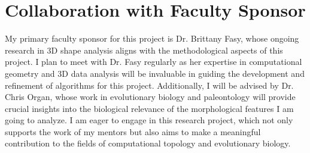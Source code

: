 \documentclass[12pt]{article}
\begin{document}
\section{Collaboration with Faculty Sponsor}
My primary faculty sponsor for this project is Dr. Brittany Fasy, whose ongoing
research in 3D shape analysis aligns with the methodological aspects of this
project. I plan to meet with Dr. Fasy regularly as her expertise in computational 
geometry and 3D data analysis will be invaluable in guiding the development and 
refinement of algorithms for this project. Additionally, I will be advised by
Dr. Chris Organ, whose work in evolutionary biology and paleontology 
will provide crucial insights into the biological relevance of the morphological 
features I am going to analyze. I am eager to engage in this research project, 
which not only supports the work of my mentors but also aims to make a meaningful 
contribution to the fields of computational topology and evolutionary biology.

\newpage

 
\end{document}
